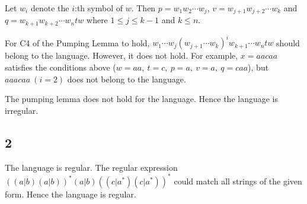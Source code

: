 \documentclass{article}
\begin{document}
Let $w_i$ denote the $i$:th symbol of
$w$. Then $p = w_1 w_2 \cdots w_j$, $v = w_{j+1} w_{j+2} \cdots w_k$
and $q = w_{k+1} w_{k+2} \cdots w_n
	t w$ where $ 1 \leq j \leq k-1$ and
$k \leq n$.

For C4 of the Pumping Lemma to hold, $w_1 \cdots w_j (w_{j+1} \cdots w_k)^i
	w_{k+1} \cdots w_n t w$ should belong to
the language. However, it does not hold. For example, $x = aacaa$
satisfies the conditions above ($w=aa, ~t=c, ~p=a, ~v=a, ~q=caa$), but
$aaacaa~(i=2)$ does not belong to
the language.

The pumping lemma does not hold for the language. Hence the language is
irregular.

\subsection*{2}
The language is regular. The regular expression $((a|b)(a|b))^*(a|b)((c|a^*)(c|a^*))^*$ could
match all strings of the given form. Hence the language is regular.
\end{document}
